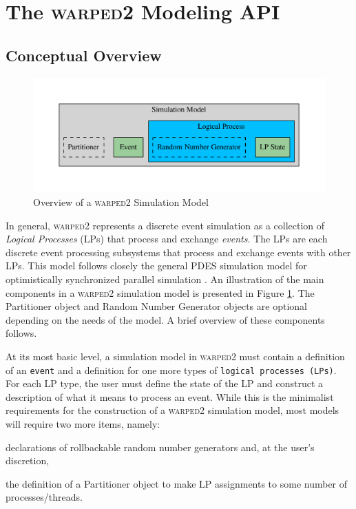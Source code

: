 \documentclass[11pt]{book}
\begin{document}
\section{The \textsc{warped2} Modeling API}

\subsection{Conceptual Overview}


\begin{figure}
    \centering
    \includegraphics[width=\textwidth,quiet]{figs/graphviz/model.pdf}
    \caption{Overview of a \textsc{warped2} Simulation Model}\label{warped2_conceptual_overview}
\end{figure}

In general, \textsc{warped2} represents a discrete event simulation as a collection of \emph{Logical
  Processes} (LPs) that process and exchange \emph{events}.  The LPs are each discrete event
processing subsystems that process and exchange events with other LPs.  This model follows closely
the general PDES simulation model for optimistically synchronized parallel simulation
\cite{fujimoto-90,jefferson-85}.  An illustration of the main components in a \textsc{warped2}
simulation model is presented in Figure \ref{warped2_conceptual_overview}.  The Partitioner object
and Random Number Generator objects are optional depending on the needs of the model.  A brief
overview of these components follows.

At its most basic level, a simulation model in \textsc{warped2} must contain a definition of an
\texttt{event} and a definition for one more types of \texttt{logical processes (LPs)}.  For
each LP type, the user must define the state of the LP and construct a description of what it
means to process an event.  While this is the minimalist requirements for the construction of
a \textsc{warped2} simulation model, most models will require two more items, namely:
\begin{inparaenum}[(1)] \item declarations of rollbackable random number generators and,
at the user's discretion, \item the definition of a Partitioner object to make LP assignments
to some number of processes/threads.\end{inparaenum}
\end{document}
